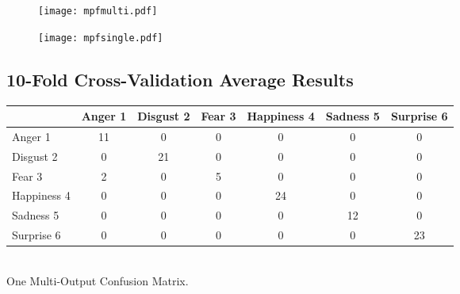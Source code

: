 \documentclass[a4paper,11pt]{article}
\begin{document}
 \begin{figure}[h]                                                               
 \begin{center}                                                                  
           \texttt{[image: mpfmulti.pdf]}                                       
 \end{center}                                                                    
 \end{figure} 
 
  \begin{figure}[h]                                                               
 \begin{center}                                                                  
           \texttt{[image: mpfsingle.pdf]}                                      
 \end{center}                                                                    
 \end{figure} 


\subsection{10-Fold Cross-Validation Average Results}
                                                              
\begin{center}                                                                  
     \begin{tabular}{ | l || c | c | c | c | c | c | }                           
     \hline                                                                      
           & Anger 1 & Disgust 2 & Fear 3 & Happiness 4 & Sadness 5 & Surprise 6 \\ \hline \hline
         Anger 1 		& 11 & 0 & 0 & 0 & 0 & 0 \\ \hline                               
         Disgust 2 		& 0 & 21 & 0 & 0 & 0 & 0 \\ \hline                            
         Fear 3 		& 2 & 0 & 5 & 0 & 0 & 0 \\ \hline                                
         Happiness 4 	& 0 & 0 & 0 & 24 & 0 & 0 \\ \hline                          
         Sadness 5 		& 0 & 0 & 0 & 0 & 12 & 0 \\ \hline                             
         Surprise 6 	& 0 & 0 & 0 & 0 & 0 & 23 \\ \hline                           
     \end{tabular}                                                               
          \\ One Multi-Output Confusion Matrix.                                         
\end{center}                                                                    
   
\end{document}
